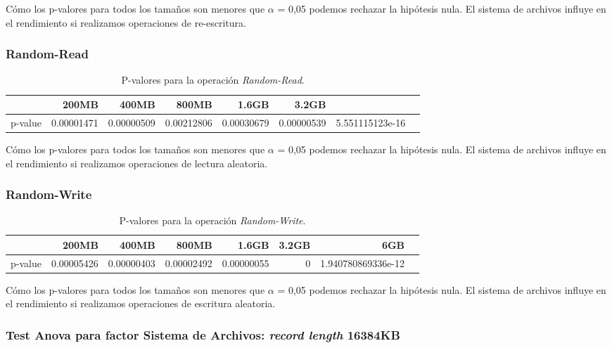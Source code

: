 Cómo los p-valores para todos los tamaños son menores que $\alpha$ = 0,05 podemos rechazar la hipótesis nula. El sistema de archivos influye en el rendimiento si realizamos operaciones de re-escritura. 

\subsubsection{Random-Read}
\begin{table}[!htp]\centering
\scriptsize
\begin{tabular}{lrrrrrrr}\toprule
&200MB &400MB &800MB &1.6GB &3.2GB \\\midrule
p-value &0.00001471 &0.00000509 &0.00212806 &0.00030679 &0.00000539 &5.551115123e-16 \\
\bottomrule
\end{tabular}
\caption{P-valores para la operación \textit{Random-Read}.}\label{tab: }
\end{table}

Cómo los p-valores para todos los tamaños son menores que $\alpha$ = 0,05 podemos rechazar la hipótesis nula. El sistema de archivos influye en el rendimiento si realizamos operaciones de lectura aleatoria. 

\subsubsection{Random-Write}
\begin{table}[!htp]\centering
\scriptsize
\begin{tabular}{lrrrrrrr}\toprule
&200MB &400MB &800MB &1.6GB &3.2GB &6GB \\\midrule
p-value &0.00005426 &0.00000403 &0.00002492 &0.00000055 &0 &1.940780869336e-12 \\
\bottomrule
\end{tabular}
\caption{P-valores para la operación \textit{Random-Write}.}\label{tab: }
\end{table}

Cómo los p-valores para todos los tamaños son menores que $\alpha$ = 0,05 podemos rechazar la hipótesis nula. El sistema de archivos influye en el rendimiento si realizamos operaciones de escritura aleatoria. 












\newpage
\subsubsection{Test Anova para factor Sistema de Archivos: \textit{record length} 16384KB}

